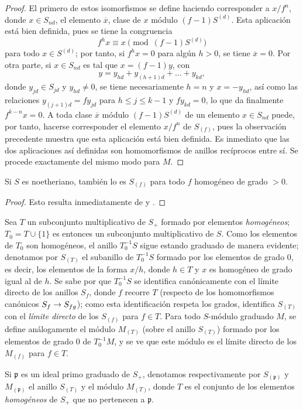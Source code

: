 \documentclass[oneside,10pt]{amsart}
\makeatletter
\renewcommand{\leq}{\leqslant}
\newcommand{\ega@arrow}[2]{\mathchoice{#1}{#2}{#2}{#2}}
\renewcommand{\to}{\ega@arrow{\longrightarrow}{\rightarrow}}
\newcommand{\oldpage}[2][]{\marginnote{\normalfont\footnotesize\textbf{#1}~|~#2}\ignorespaces}
\let\EGAOriginalLabel\label
\renewcommand{\label}[1]{\phantomsection\EGAOriginalLabel{#1}}
\makeatother
\begin{document}
\begin{proof}
El primero de estos isomorfismos se define haciendo corresponder a $x/f^n$, donde $x\in S_{nd}$, el elemento $\overline{x}$, clase de $x$ módulo $(f-1)S^{(d)}$.
Esta aplicación está bien definida, pues se tiene la congruencia
\[
  f^hx\equiv x\pmod{(f-1)S^{(d)}}
\]
para todo $x\in S^{(d)}$; por tanto, si $f^hx=0$ para algún $h>0$,
\oldpage[II]{25}
se tiene $\overline{x}=0$.
Por otra parte, si $x\in S_{nd}$ es tal que $x=(f-1)y$, con
\[
  y=y_{hd}+y_{(h+1)d}+\ldots+y_{kd},
\]
donde $y_{jd}\in S_{jd}$ y $y_{hd}\neq0$, se tiene necesariamente $h=n$ y $x=-y_{hd}$, así como las relaciones $y_{(j+1)d}=fy_{jd}$ para $h\leq j\leq k-1$ y $fy_{kd}=0$, lo que da finalmente $f^{k-n}x=0$.
A toda clase $\overline{x}$ módulo $(f-1)S^{(d)}$ de un elemento $x\in S_{nd}$ puede, por tanto, hacerse corresponder el elemento $x/f^n$ de $S_{(f)}$, pues la observación precedente muestra que esta aplicación está bien definida.
Es inmediato que las dos aplicaciones así definidas son homomorfismos de anillos recíprocos entre sí.
Se procede exactamente del mismo modo para $M$.
\end{proof}

\begin{corollary}[2.2.6]
\label{II.2.2.6}
Si $S$ es noetheriano, también lo es $S_{(f)}$ para todo $f$ homogéneo de grado $>0$.
\end{corollary}

\begin{proof}
Esto resulta inmediatamente de  y .
\end{proof}

\begin{env}[2.2.7]
\label{II.2.2.7}
Sea $T$ un subconjunto multiplicativo de $S_+$ formado por elementos \emph{homogéneos}; $T_0=T\cup\{1\}$ es entonces un subconjunto multiplicativo de $S$.
Como los elementos de $T_0$ son homogéneos, el anillo $T_0^{-1}S$ sigue estando graduado de manera evidente; denotamos por $S_{(T)}$ el subanillo de $T_0^{-1}S$ formado por los elementos de grado $0$, es decir, los elementos de la forma $x/h$, donde $h\in T$ y $x$ es homogéneo de grado igual al de $h$.
Se sabe por  que $T_0^{-1}S$ se identifica canónicamente con el límite directo de los anillos $S_f$, donde $f$ recorre $T$ (respecto de los homomorfismos canónicos $S_f\to S_{fg}$); como esta identificación respeta los grados, identifica $S_{(T)}$ con el \emph{límite directo} de los $S_{(f)}$ para $f\in T$.
Para todo $S$-módulo graduado $M$, se define análogamente el módulo $M_{(T)}$ (sobre el anillo $S_{(T)}$) formado por los elementos de grado $0$ de $T_0^{-1}M$, y se ve que este módulo es el límite directo de los $M_{(f)}$ para $f\in T$.

Si $\mathfrak{p}$ es un ideal primo graduado de $S_+$, denotamos respectivamente por $S_{(\mathfrak{p})}$ y $M_{(\mathfrak{p})}$ el anillo $S_{(T)}$ y el módulo $M_{(T)}$, donde $T$ es el conjunto de los elementos \emph{homogéneos} de $S_+$ que no pertenecen a $\mathfrak{p}$.
\end{env}
\end{document}
